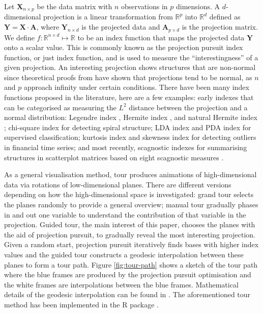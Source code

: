 Let \(\mathbf{X}_{n \times p}\) be the data matrix with \(n\)
observations in \(p\) dimensions. A \(d\)-dimensional projection is a
linear transformation from \(\mathbb{R}^p\) into \(\mathbb{R}^d\)
defined as \(\mathbf{Y} = \mathbf{X} \cdot \mathbf{A}\), where
\(\mathbf{Y}_{n \times d}\) is the projected data and
\(\mathbf{A}_{p\times d}\) is the projection matrix. We define
\(f: \mathbb{R}^{n \times d} \mapsto \mathbb{R}\) to be an index
function that maps the projected data \(\mathbf{Y}\) onto a scalar
value. This is commonly known as the projection pursuit index function,
or just index function, and is used to measure the ``interestingness''
of a given projection. An interesting projection shows structures that
are non-normal since theoretical proofs from
\citet{diaconis1984asymptotics} have shown that projections tend to be
normal, as \(n\) and \(p\) approach infinity under certain conditions.
There have been many index functions proposed in the literature, here
are a few examples: early indexes that can be categorised as measuring
the \(L^2\) distance between the projection and a normal distribution:
Legendre index \citep{friedman1974projection}, Hermite index
\citep{hall1989polynomial}, and natural Hermite index
\citep{cook1993projection}; chi-square index \citep{posse1995projection}
for detecting spiral structure; LDA index \citep{lee2005projection} and
PDA \citep{lee2010projection} index for supervised classification;
kurtosis index \citep{Loperfido2020} and skewness index
\citep{Loperfido2018} for detecting outliers in financial time series;
and most recently, scagnostic indexes \citep{laa2020using} for
summarising structures in scatterplot matrices based on eight scagnostic
measures \citep{scag, WW08}.

As a general visualisation method, tour produces animations of
high-dimensional data via rotations of low-dimensional planes. There are
different versions depending on how the high-dimensional space is
investigated: grand tour \citep{cook2008grand} selects the planes
randomly to provide a general overview; manual tour
\citep{cook1997manual} gradually phases in and out one variable to
understand the contribution of that variable in the projection. Guided
tour, the main interest of this paper, chooses the planes with the aid
of projection pursuit, to gradually reveal the most interesting
projection. Given a random start, projection pursuit iteratively finds
bases with higher index values and the guided tour constructs a geodesic
interpolation between these planes to form a tour path. Figure
\ref{fig:tour-path} shows a sketch of the tour path where the blue
frames are produced by the projection pursuit optimisation and the white
frames are interpolations between the blue frames. Mathematical details
of the geodesic interpolation can be found in
\citet{buja2005computational}. The aforementioned tour method has been
implemented in the R package  \citep{tourr}.

